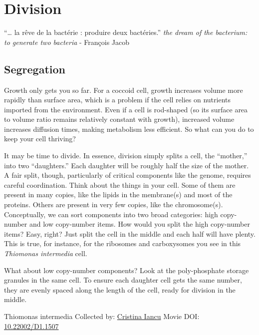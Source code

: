 \documentclass[]{tufte-book}
\begin{document}
\hypertarget{division}{%
\chapter{Division}\label{division}}

``\ldots{} la rêve de la bactérie : produire deux bactéries.''
\emph{the dream of the bacterium: to generate two bacteria}
- François Jacob \citep{jacob2002a}

\hypertarget{segregation}{%
\section{Segregation}\label{segregation}}

Growth only gets you so far. For a coccoid cell, growth increases volume more rapidly than surface area, which is a problem if the cell relies on nutrients imported from the environment. Even if a cell is rod-shaped (so its surface area to volume ratio remains relatively constant with growth), increased volume increases diffusion times, making metabolism less efficient. So what can you do to keep your cell thriving?

It may be time to divide. In essence, division simply splits a cell, the ``mother,'' into two ``daughters.'' Each daughter will be roughly half the size of the mother. A fair split, though, particularly of critical components like the genome, requires careful coordination. Think about the things in your cell. Some of them are present in many copies, like the lipids in the membrane(s) and most of the proteins. Others are present in very few copies, like the chromosome(s). Conceptually, we can sort components into two broad categories: high copy-number and low copy-number items. How would you split the high copy-number items? Easy, right? Just split the cell in the middle and each half will have plenty. This is true, for instance, for the ribosomes and carboxysomes you see in this \emph{Thiomonas intermedia} cell.

What about low copy-number components? Look at the poly-phosphate storage granules in the same cell. To ensure each daughter cell gets the same number, they are evenly spaced along the length of the cell, ready for division in the middle.



\hypertarget{htmlwidget-42c14ba6a2ae317c3836}{}

\label{fig:5-1}Thiomonas intermedia Collected by: \protect\hyperlink{cristina_iancu}{Cristina Iancu} Movie DOI: \href{https://doi.org/10.22002/D1.1507}{10.22002/D1.1507}
\end{document}
